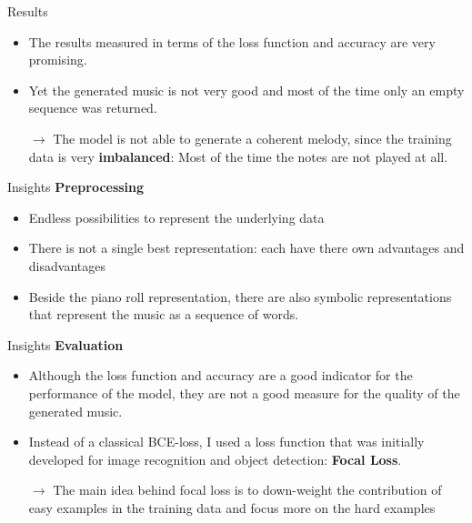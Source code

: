 \documentclass[xcolor={dvipsnames},12pt]{beamer}
\begin{document}
\begin{frame}{Results}
    \begin{itemize}
        \item The results measured in terms of the loss function and accuracy
              are very promising.
        \item Yet the generated music is not very good and most of the time
              only an empty sequence was returned.
        \item[$\rightarrow$] The model is not able to generate a coherent
            melody, since the training data is very \textbf{imbalanced}: Most
            of the time the notes are not played at all.
    \end{itemize}
\end{frame}

\begin{frame}{Insights}
    \textbf{Preprocessing}
    \begin{itemize}
        \item Endless possibilities to represent the underlying data
        \item There is not a single best representation: each have there own
              advantages and disadvantages
        \item Beside the piano roll representation, there are also symbolic
              representations that represent the music as a sequence of words.
    \end{itemize}
\end{frame}

\begin{frame}{Insights}
    \textbf{Evaluation}
    \begin{itemize}
        \item Although the loss function and accuracy are a good indicator for
              the performance of the model, they are not a good measure for the
              quality of the generated music.
        \item Instead of a classical BCE-loss, I used a loss function that was
              initially developed for image recognition and object detection:
              \textbf{Focal Loss}.
        \item[$\rightarrow$] The main idea behind focal loss is to down-weight
            the contribution of easy examples in the training data and focus more
            on the hard examples
    \end{itemize}
\end{frame}
\end{document}
